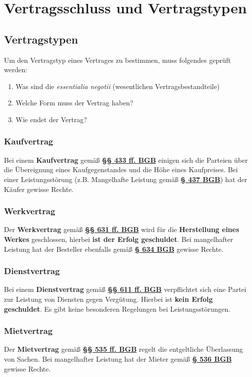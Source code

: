 \documentclass[12pt,A4]{extarticle}
\newcommand{\highlight}[1]{\textcolor{highlightColor}{\textbf{#1}}}
\newcommand{\bgb}[2][]{\textbf{\textcolor{gesetzLink}{\href{https://www.gesetze-im-internet.de/bgb/__#2.html}{§ #2 \ifthenelse{\equal{#1}{}}{}{#1 }BGB}}}}
\newcommand{\bgbb}[2][]{\textbf{\textcolor{gesetzLink}{\href{https://www.gesetze-im-internet.de/bgb/__#2.html}{§§ #1 BGB}}}}
\begin{document}
\disclaimer

\tableofcontents
\clearpage

\section{Vertragsschluss und Vertragstypen}
\subsection{Vertragstypen}
Um den Vertragstyp eines Vertrages zu bestimmen, muss folgendes geprüft werden:

\begin{enumerate}
  \item{Was sind die \textit{essentialia negotii} (wesentlichen Vertragsbestandteile)}
  \item{Welche Form muss der Vertrag haben?}
  \item{Wie endet der Vertrag?}
\end{enumerate}

\subsubsection{Kaufvertrag}
Bei einem \highlight{Kaufvertrag} gemäß \bgbb[433 ff.]{433} einigen sich die Parteien über die Übereignung eines Kaufgegenstandes und die Höhe eines Kaufpreises. 
Bei einer Leistungsstörung (z.B. Mangelhafte Leistung gemäß \bgb{437}) hat der Käufer gewisse Rechte.

\subsubsection{Werkvertrag}
Der \highlight{Werkvertrag} gemäß \bgbb[631 ff.]{631} wird für die \textbf{Herstellung eines Werkes} geschlossen, hierbei \textbf{ist der Erfolg geschuldet}. 
Bei mangelhafter Leistung hat der Besteller ebenfalls gemäß \bgb{634} gewisse Rechte.

\subsubsection{Dienstvertrag}
Bei einem \highlight{Dienstvertrag} gemäß \bgbb[611 ff.]{611} verpflichtet sich eine Partei zur Leistung von Diensten gegen Vergütung. Hierbei ist \textbf{kein Erfolg geschuldet}.
Es gibt keine besonderen Regelungen bei Leistungsstörungen.

\subsubsection{Mietvertrag}
Der \highlight{Mietvertrag} gemäß \bgbb[535 ff.]{535} regelt die entgeltliche Überlassung von Sachen. 
Bei mangelhafter Leistung hat der Mieter gemäß \bgb{536} gewisse Rechte.
\end{document}
